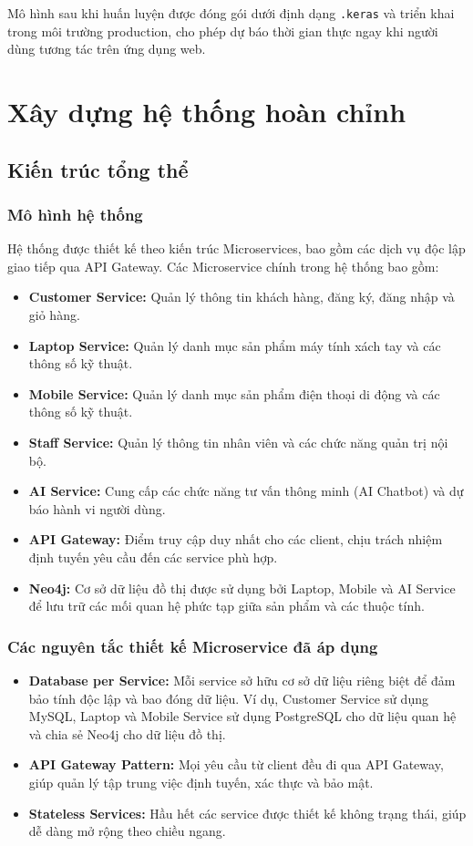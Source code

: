 \documentclass[12pt,a4paper]{report}
\begin{document}
Mô hình sau khi huấn luyện được đóng gói dưới định dạng \texttt{.keras} và triển khai trong môi trường production, cho phép dự báo thời gian thực ngay khi người dùng tương tác trên ứng dụng web.



\chapter{Xây dựng hệ thống hoàn chỉnh}

\section{Kiến trúc tổng thể}
\subsection{Mô hình hệ thống}
Hệ thống được thiết kế theo kiến trúc Microservices, bao gồm các dịch vụ độc lập giao tiếp qua API Gateway. Các Microservice chính trong hệ thống bao gồm:
\begin{itemize}
    \item \textbf{Customer Service:} Quản lý thông tin khách hàng, đăng ký, đăng nhập và giỏ hàng.
    \item \textbf{Laptop Service:} Quản lý danh mục sản phẩm máy tính xách tay và các thông số kỹ thuật.
    \item \textbf{Mobile Service:} Quản lý danh mục sản phẩm điện thoại di động và các thông số kỹ thuật.
    \item \textbf{Staff Service:} Quản lý thông tin nhân viên và các chức năng quản trị nội bộ.
    \item \textbf{AI Service:} Cung cấp các chức năng tư vấn thông minh (AI Chatbot) và dự báo hành vi người dùng.
    \item \textbf{API Gateway:} Điểm truy cập duy nhất cho các client, chịu trách nhiệm định tuyến yêu cầu đến các service phù hợp.
    \item \textbf{Neo4j:} Cơ sở dữ liệu đồ thị được sử dụng bởi Laptop, Mobile và AI Service để lưu trữ các mối quan hệ phức tạp giữa sản phẩm và các thuộc tính.
\end{itemize}

\subsection{Các nguyên tắc thiết kế Microservice đã áp dụng}
\begin{itemize}
    \item \textbf{Database per Service:} Mỗi service sở hữu cơ sở dữ liệu riêng biệt để đảm bảo tính độc lập và bao đóng dữ liệu. Ví dụ, Customer Service sử dụng MySQL, Laptop và Mobile Service sử dụng PostgreSQL cho dữ liệu quan hệ và chia sẻ Neo4j cho dữ liệu đồ thị.
    \item \textbf{API Gateway Pattern:} Mọi yêu cầu từ client đều đi qua API Gateway, giúp quản lý tập trung việc định tuyến, xác thực và bảo mật.
    \item \textbf{Stateless Services:} Hầu hết các service được thiết kế không trạng thái, giúp dễ dàng mở rộng theo chiều ngang.
\end{itemize}
\end{document}
